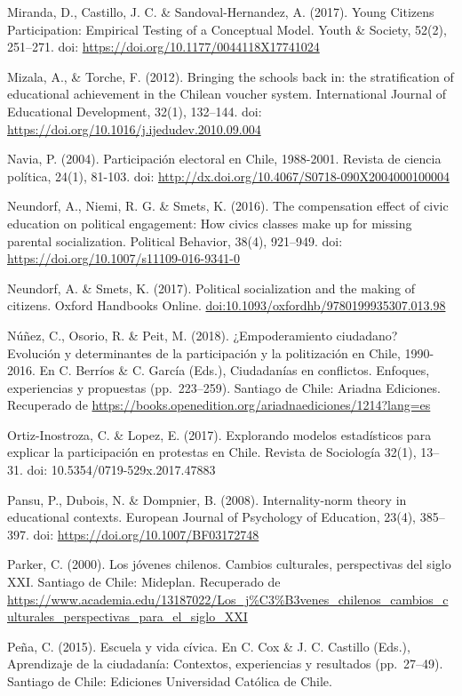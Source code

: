 \documentclass[12pt,twoside]{templates/facsothesis}
\begin{document}
Miranda, D., Castillo, J. C. \& Sandoval-Hernandez, A. (2017). Young Citizens Participation: Empirical Testing of a Conceptual Model. Youth \& Society, 52(2), 251--271. doi: \url{https://doi.org/10.1177/0044118X17741024}

Mizala, A., \& Torche, F. (2012). Bringing the schools back in: the stratification of educational achievement in the Chilean voucher system. International Journal of Educational Development, 32(1), 132--144. doi: \url{https://doi.org/10.1016/j.ijedudev.2010.09.004}

Navia, P. (2004). Participación electoral en Chile, 1988-2001. Revista de ciencia política, 24(1), 81-103. doi: \url{http://dx.doi.org/10.4067/S0718-090X2004000100004}

Neundorf, A., Niemi, R. G. \& Smets, K. (2016). The compensation effect of civic education on political engagement: How civics classes make up for missing parental socialization. Political Behavior, 38(4), 921--949. doi: \url{https://doi.org/10.1007/s11109-016-9341-0}

Neundorf, A. \& Smets, K. (2017). Political socialization and the making of citizens. Oxford Handbooks Online. \url{doi:10.1093/oxfordhb/9780199935307.013.98}

Núñez, C., Osorio, R. \& Peit, M. (2018). ¿Empoderamiento ciudadano? Evolución y determinantes de la participación y la politización en Chile, 1990-2016. En C. Berríos \& C. García (Eds.), Ciudadanías en conflictos. Enfoques, experiencias y propuestas (pp.~223--259). Santiago de Chile: Ariadna Ediciones. Recuperado de \url{https://books.openedition.org/ariadnaediciones/1214?lang=es}

Ortiz-Inostroza, C. \& Lopez, E. (2017). Explorando modelos estadísticos para explicar la participación en protestas en Chile. Revista de Sociología 32(1), 13--31. doi: 10.5354/0719-529x.2017.47883

Pansu, P., Dubois, N. \& Dompnier, B. (2008). Internality-norm theory in educational contexts. European Journal of Psychology of Education, 23(4), 385--397. doi: \url{https://doi.org/10.1007/BF03172748}

Parker, C. (2000). Los jóvenes chilenos. Cambios culturales, perspectivas del siglo XXI. Santiago de Chile: Mideplan. Recuperado de \url{https://www.academia.edu/13187022/Los_j\%C3\%B3venes_chilenos_cambios_culturales_perspectivas_para_el_siglo_XXI}

Peña, C. (2015). Escuela y vida cívica. En C. Cox \& J. C. Castillo (Eds.), Aprendizaje de la ciudadanía: Contextos, experiencias y resultados (pp.~27--49). Santiago de Chile: Ediciones Universidad Católica de Chile.
\end{document}
